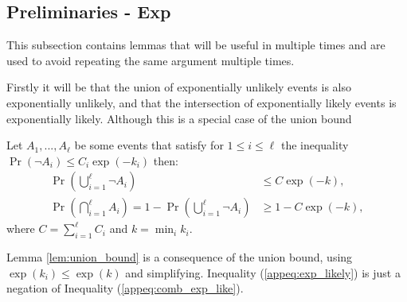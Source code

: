     
    \subsection{Preliminaries - Exp}

        
    
    
    
    
    
    
        This subsection contains lemmas that will be useful in multiple times and are used to avoid repeating the same argument multiple times. 

        





        Firstly it will be that the union of exponentially unlikely events is also exponentially unlikely, and that the intersection of exponentially likely events is exponentially likely. Although this is a special case of the union bound  
        \begin{lemma} \label{lem:union_bound}
            Let $A_1,...,A_{\ell}$ be some events that satisfy for $1\leq i \leq \ell$ the inequality $\Pr(\lnot A_i) \leq C_i\exp(-k_i)$ then:
            \begin{align}
                \Pr\left(\bigcup_{i=1}^\ell \lnot A_i\right) &\leq C\exp(-k), \label{appeq:comb_exp_like} \\
                \Pr\left(\bigcap_{i=1}^\ell A_i\right) = 1-\Pr\left(\bigcup_{i=1}^\ell \lnot A_i\right) &\geq 1-C\exp(-k), \label{appeq:exp_likely}
            \end{align}
            where $C=\sum_{i=1}^\ell C_i$ and $k = \min_i k_i$.
        \end{lemma}
        \begin{proofoutline}
            Lemma \ref{lem:union_bound} is a consequence of the union bound, using $\exp(k_i)\leq\exp(k)$ and simplifying. Inequality (\ref{appeq:exp_likely}) is just a negation of Inequality (\ref{appeq:comb_exp_like}).
        \end{proofoutline}






